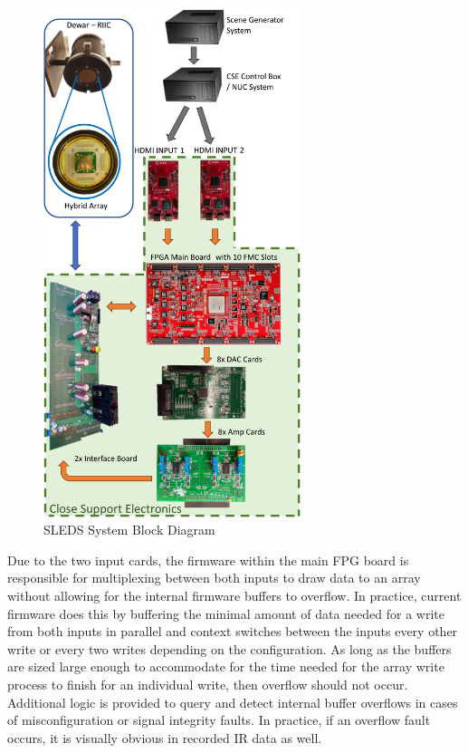     \begin{figure}
        \centering
        \includegraphics[width=0.67\textwidth]{fig/sleds_block.pdf}
        \caption{SLEDS System Block Diagram}
        \label{fig:sleds_block}
    \end{figure}

    Due to the two input cards, the firmware within the main FPG board is responsible for multiplexing between both inputs to draw data to an array without allowing for the internal firmware buffers to overflow. In practice, current firmware does this by buffering the minimal amount of data needed for a write from both inputs in parallel and context switches between the inputs every other write or every two writes depending on the configuration. As long as the buffers are sized large enough to accommodate for the time needed for the array write process to finish for an individual write, then overflow should not occur. Additional logic is provided to query and detect internal buffer overflows in cases of misconfiguration or signal integrity faults. In practice, if an overflow fault occurs, it is visually obvious in recorded IR data as well.

